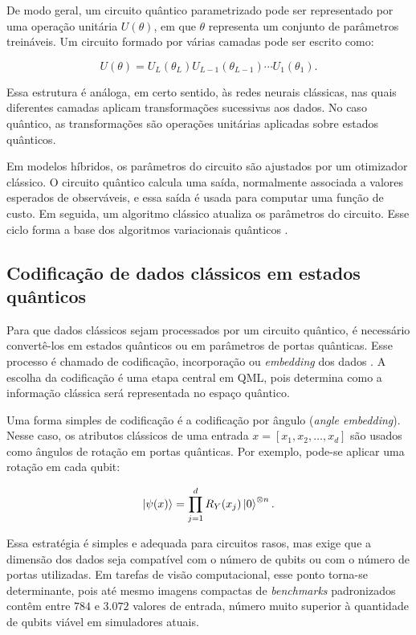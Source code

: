 \documentclass[
    12pt,
    openright,
    oneside,
    a4paper,
    english,
    brazil
]{abntex2}
\begin{document}
De modo geral, um circuito quântico parametrizado pode ser representado por uma operação unitária \(U(\theta)\), em que \(\theta\) representa um conjunto de parâmetros treináveis. Um circuito formado por várias camadas pode ser escrito como:

\[
U(\theta) =
U_L(\theta_L)
U_{L-1}(\theta_{L-1})
\cdots
U_1(\theta_1).
\]

Essa estrutura é análoga, em certo sentido, às redes neurais clássicas, nas quais diferentes camadas aplicam transformações sucessivas aos dados. No caso quântico, as transformações são operações unitárias aplicadas sobre estados quânticos.

Em modelos híbridos, os parâmetros do circuito são ajustados por um otimizador clássico. O circuito quântico calcula uma saída, normalmente associada a valores esperados de observáveis, e essa saída é usada para computar uma função de custo. Em seguida, um algoritmo clássico atualiza os parâmetros do circuito. Esse ciclo forma a base dos algoritmos variacionais quânticos \cite{cerezo2021variational}.

\subsection{Codificação de dados clássicos em estados quânticos}

Para que dados clássicos sejam processados por um circuito quântico, é necessário convertê-los em estados quânticos ou em parâmetros de portas quânticas. Esse processo é chamado de codificação, incorporação ou \textit{embedding} dos dados \cite{schuld2021effect}. A escolha da codificação é uma etapa central em QML, pois determina como a informação clássica será representada no espaço quântico.

Uma forma simples de codificação é a codificação por ângulo (\textit{angle embedding}). Nesse caso, os atributos clássicos de uma entrada \(x = [x_1, x_2, \ldots, x_d]\) são usados como ângulos de rotação em portas quânticas. Por exemplo, pode-se aplicar uma rotação em cada qubit:

\[
\ket{\psi(x)}
=
\prod_{j=1}^{d}
R_Y(x_j)
\ket{0}^{\otimes n}.
\]

Essa estratégia é simples e adequada para circuitos rasos, mas exige que a dimensão dos dados seja compatível com o número de qubits ou com o número de portas utilizadas. Em tarefas de visão computacional, esse ponto torna-se determinante, pois até mesmo imagens compactas de \textit{benchmarks} padronizados contêm entre \(784\) e \(3.072\) valores de entrada, número muito superior à quantidade de qubits viável em simuladores atuais.
\end{document}
